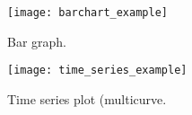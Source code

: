 \begin{figure}[ht]
\centering
\texttt{[image: barchart\_example]}
\caption{Bar graph.}
\label{fig:barchart_example}
\end{figure}
\clearpage
\begin{figure}[ht]
\centering
\texttt{[image: time\_series\_example]}
\caption{Time series plot (multicurve.}
\label{fig:piechart_example}
\end{figure}